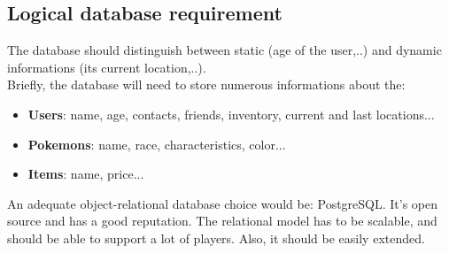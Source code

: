 \documentclass[a4paper,09pt]{article}
\begin{document}
\subsection{Logical database requirement}

The database should distinguish between static (age of the user,..)
and dynamic informations (its current location,..).\\
Briefly, the database will need to store numerous informations about the:

\begin{itemize}
\item
  \textbf{Users}: name, age, contacts, friends,
  inventory, current and last locations...
\item
  \textbf{Pokemons}: name, race, characteristics, color...
\item
  \textbf{Items}: name, price...
\end{itemize}

An adequate object-relational database choice would be: PostgreSQL.
It's open source and has a good reputation.
The relational model has to be scalable, and should be able to
support a lot of players. Also, it should be easily extended.
\end{document}
